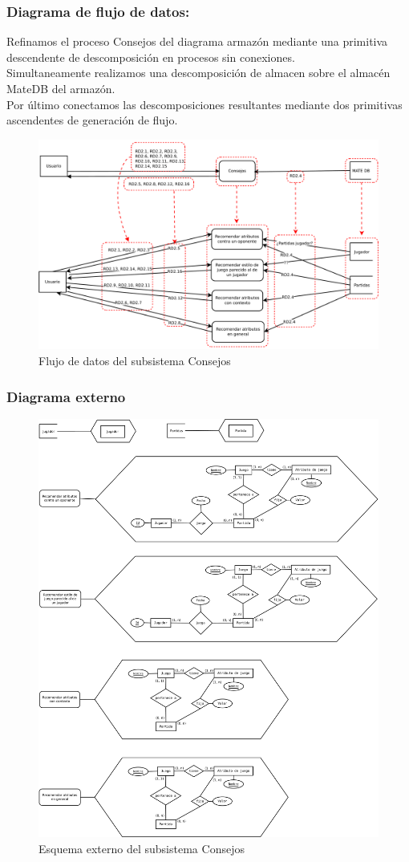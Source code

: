 \subsubsection{Diagrama de flujo de datos:}

Refinamos el proceso Consejos del diagrama armazón mediante
una primitiva descendente de descomposición en procesos sin conexiones.\\
Simultaneamente realizamos una descomposición de almacen sobre el
almacén MateDB del armazón.\\
Por último conectamos las descomposiciones resultantes mediante dos
primitivas ascendentes de generación de flujo.\\ 
 
\begin{figure}[H]
\centering
\includegraphics[width=0.7\linewidth]{../Diagramas/pdf/Consejos/RefinamientoConsejos.pdf}
\caption{Flujo de datos del subsistema Consejos}
\end{figure}


\subsubsection{Diagrama externo}

\begin{figure}[H]
\centering
\includegraphics[width=0.7\linewidth]{../Diagramas/pdf/Consejos/ExternoConsejos.pdf}
\caption{Esquema externo del subsistema Consejos}
\end{figure}


